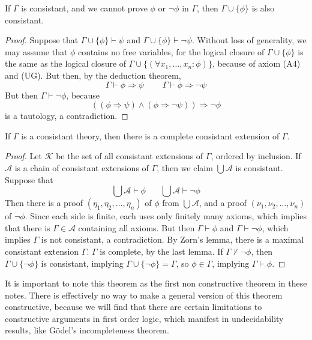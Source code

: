 \begin{theorem}
    If $\Gamma$ is consistant, and we cannot prove $\phi$ or $\neg \phi$ in $\Gamma$, then $\Gamma \cup \{ \phi \}$ is also consistant.
\end{theorem}
\begin{proof}
    Suppose that $\Gamma \cup \{ \phi \} \vdash \psi$ and $\Gamma \cup \{ \phi \} \vdash \neg \psi$. Without loss of generality, we may assume that $\phi$ contains no free variables, for the logical closure of $\Gamma \cup \{ \phi \}$ is the same as the logical closure of $\Gamma \cup \{ (\forall x_1, \dots, x_n: \phi) \}$, because of axiom (A4) and (UG). But then, by the deduction theorem,
    \[ \Gamma \vdash \phi \Rightarrow \psi\ \ \ \ \ \ \ \ \ \ \Gamma \vdash \phi \Rightarrow \neg \psi \]
    But then $\Gamma \vdash \neg \phi$, because
    \[ ((\phi \Rightarrow \psi) \wedge (\phi \Rightarrow \neg \psi)) \Rightarrow \neg \phi \]
    is a tautology, a contradiction.
\end{proof}

\begin{lemma}[Lindenbaum]
    If $\Gamma$ is a consistant theory, then there is a complete consistant extension of $\Gamma$.
\end{lemma}
\begin{proof}
    Let $\mathcal{K}$ be the set of all consistant extensions of $\Gamma$, ordered by inclusion. If $\mathcal{A}$ is a chain of consistant extensions of $\Gamma$, then we claim $\bigcup \mathcal{A}$ is consistant. Suppose that
    \[ \bigcup \mathcal{A} \vdash \phi\ \ \ \ \ \ \ \ \bigcup \mathcal{A} \vdash \neg \phi \]
    Then there is a proof $(\eta_1, \eta_2, \dots, \eta_n)$ of $\phi$ from $\bigcup \mathcal{A}$, and a proof $(\nu_1, \nu_2, \dots, \nu_n)$ of $\neg \phi$. Since each side is finite, each uses only finitely many axioms, which implies that there is $\Gamma \in \mathcal{A}$ containing all axioms. But then $\Gamma \vdash \phi$ and $\Gamma \vdash \neg \phi$, which implies $\Gamma$ is not consistant, a contradiction. By Zorn's lemma, there is a maximal consistant extension $\Gamma$. $\Gamma$ is complete, by the last lemma. If $\Gamma \not \vdash \neg \phi$, then $\Gamma \cup \{ \neg \phi \}$ is consistant, implying $\Gamma \cup \{ \neg \phi \} = \Gamma$, so $\phi \in \Gamma$, implying $\Gamma \vdash \phi$.
\end{proof}

It is important to note this theorem as the first non constructive theorem in these notes. There is effectively no way to make a general version of this theorem constructive, because we will find that there are certain limitations to constructive arguments in first order logic, which manifest in undecidability results, like G\"{o}del's incompleteness theorem.

